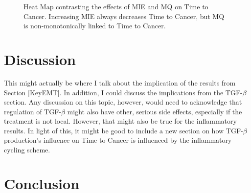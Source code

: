 \documentclass{article}
\begin{document}
\begin{figure}[H]
\center
{}
\caption{Heat Map contrasting the effects of MIE and MQ on Time to Cancer. Increasing MIE always decreases Time to Cancer, but MQ is non-monotonically linked to Time to Cancer.}
\label{fig:MIEvsMQ}
\end{figure}

\section{Discussion}\label{Discussion}
This might actually be where I talk about the implication of the results from Section \ref{KeyEMT}.
In addition, I could discuss the implications from the TGF-$\beta$ section.
Any discussion on this topic, however, would need to acknowledge that regulation of TGF-$\beta$ might also have other, serious side effects, especially if the treatment is not local.
However, that might also be true for the inflammatory results.
In light of this, it might be good to include a new section on how TGF-$\beta$ production's influence on Time to Cancer is influenced by the inflammatory cycling scheme.


\section{Conclusion}\label{Conclusion}
\end{document}
